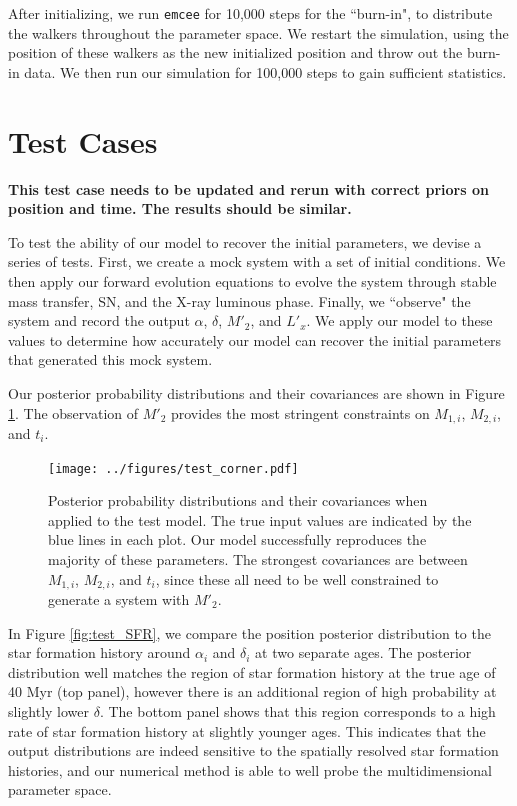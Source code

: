 \documentclass[12pt, preprint]{aastex}
\begin{document}
After initializing, we run {\tt emcee} for 10,000 steps for the ``burn-in", to distribute the walkers throughout the parameter space. We restart the simulation, using the position of these walkers as the new initialized position and throw out the burn-in data. We then run our simulation for 100,000 steps to gain sufficient statistics. 





\section{Test Cases}

{\bf This test case needs to be updated and rerun with correct priors on position and time. The results should be similar.}

To test the ability of our model to recover the initial parameters, we devise a series of tests. First, we create a mock system with a set of initial conditions. We then apply our forward evolution equations to evolve the system through stable mass transfer, SN, and the X-ray luminous phase. Finally, we ``observe" the system and record the output $\alpha$, $\delta$, $M'_2$, and $L'_x$. We apply our model to these values to determine how accurately our model can recover the initial parameters that generated this mock system. 

Our posterior probability distributions and their covariances are shown in Figure \ref{fig:test_corner}. The observation of $M'_2$ provides the most stringent constraints on $M_{1,i}$, $M_{2,i}$, and $t_i$.

\begin{figure}[h!]
\begin{center}
\texttt{[image: ../figures/test\_corner.pdf]}
\caption{Posterior probability distributions and their covariances when applied to the test model. The true input values are indicated by the blue lines in each plot. Our model successfully reproduces the majority of these parameters. The strongest covariances are between $M_{1,i}$, $M_{2,i}$, and $t_i$, since these all need to be well constrained to generate a system with $M'_2$. }
\label{fig:test_corner}
\end{center}
\end{figure}


In Figure \ref{fig:test_SFR}, we compare the position posterior distribution to the star formation history around $\alpha_i$ and $\delta_i$ at two separate ages. The posterior distribution well matches the region of star formation history at the true age of 40 Myr (top panel), however there is an additional region of high probability at slightly lower $\delta$. The bottom panel shows that this region corresponds to a high rate of star formation history at slightly younger ages. This indicates that the output distributions are indeed sensitive to the spatially resolved star formation histories, and our numerical method is able to well probe the multidimensional parameter space.
\end{document}
